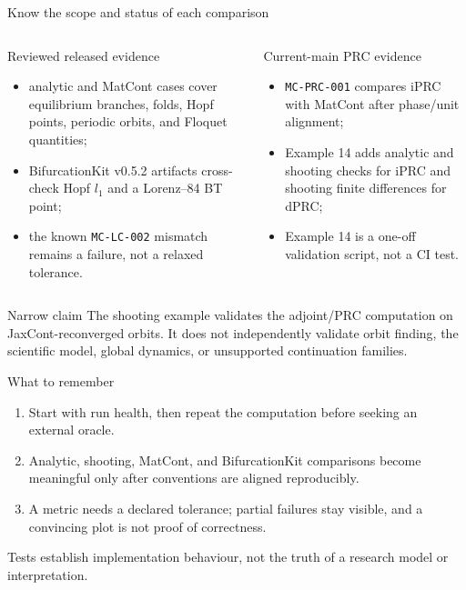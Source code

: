 \begin{frame}{Know the scope and status of each comparison}
\scriptsize
\begin{columns}[T,onlytextwidth]
\releasedbadge
\begin{block}{Reviewed released evidence}
\begin{itemize}
  \item analytic and MatCont cases cover equilibrium branches, folds, Hopf points, periodic orbits, and Floquet quantities;
  \item BifurcationKit v0.5.2 artifacts cross-check Hopf $l_1$ and a Lorenz--84 BT point;
  \item the known \texttt{MC-LC-002} mismatch remains a failure, not a relaxed tolerance.
\end{itemize}
\end{block}
\mainbadge
\begin{block}{Current-main PRC evidence}
\begin{itemize}
  \item \texttt{MC-PRC-001} compares iPRC with MatCont after phase/unit alignment;
  \item Example 14 adds analytic and shooting checks for iPRC and shooting finite differences for dPRC;
  \item Example 14 is a one-off validation script, not a CI test.
\end{itemize}
\end{block}
\end{columns}
\vspace{2mm}
\begin{alertblock}{Narrow claim}
The shooting example validates the adjoint/PRC computation on JaxCont-reconverged orbits. It does not independently validate orbit finding, the scientific model, global dynamics, or unsupported continuation families.
\end{alertblock}
\end{frame}

\begin{frame}{What to remember}
\large
\begin{enumerate}
  \item Start with run health, then repeat the computation before seeking an external oracle.
  \item Analytic, shooting, MatCont, and BifurcationKit comparisons become meaningful only after conventions are aligned reproducibly.
  \item A metric needs a declared tolerance; partial failures stay visible, and a convincing plot is not proof of correctness.
\end{enumerate}
\vfill
\centering
\releasedbadge\qquad\mainbadge

\vspace{2mm}
{\small Tests establish implementation behaviour, not the truth of a research model or interpretation.}
\end{frame}
